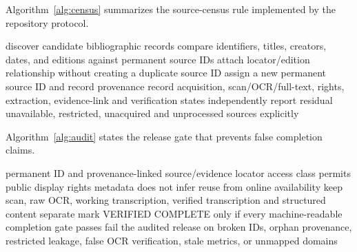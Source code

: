 \documentclass[11pt]{article}
\begin{document}
Algorithm~\ref{alg:census} summarizes the source-census rule implemented by the repository protocol.
\begin{algorithm}[ht]
\caption{Evidence-preserving source census and registration}
\label{alg:census}
\begin{algorithmic}[1]
  \State discover candidate bibliographic records
  \State compare identifiers, titles, creators, dates, and editions against permanent source IDs
    \State attach locator/edition relationship without creating a duplicate source ID
  \Else
    \State assign a new permanent source ID and record provenance
  \EndIf
  \State record acquisition, scan/OCR/full-text, rights, extraction, evidence-link and verification states independently
\EndFor
\State report residual unavailable, restricted, unacquired and unprocessed sources explicitly
\end{algorithmic}
\end{algorithm}

Algorithm~\ref{alg:audit} states the release gate that prevents false completion claims.
\begin{algorithm}[ht]
\caption{Completeness and access audit}
\label{alg:audit}
\begin{algorithmic}[1]
  \Require permanent ID and provenance-linked source/evidence locator
  \Require access class permits public display
  \Require rights metadata does not infer reuse from online availability
\EndFor
{}
  \State keep scan, raw OCR, working transcription, verified transcription and structured content separate
  \State mark VERIFIED COMPLETE only if every machine-readable completion gate passes
\EndFor
\State fail the audited release on broken IDs, orphan provenance, restricted leakage, false OCR verification, stale metrics, or unmapped domains
\end{algorithmic}
\end{algorithm}
\end{document}
